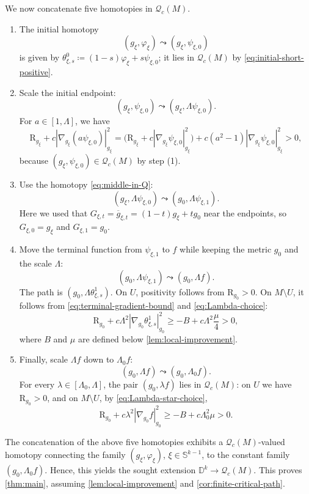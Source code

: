 \documentclass[11pt]{amsart}
\numberwithin{equation}{section}
\newcommand{\scal}{\mathrm{R}}
\newcommand{\Q}{\mathcal Q}
\let\geq\geqslant
\begin{document}
We now concatenate five homotopies in $\Q_c(M)$.
\begin{enumerate}[label=\textup{(\arabic*)}]
\item The initial homotopy
\[
 (g_\xi,\varphi_\xi)\leadsto(g_\xi,\psi_{\xi,0})
\]
is given by $\theta^{0}_{\xi,s}\coloneqq (1-s)\varphi_\xi+s\psi_{\xi,0}$; it lies in $\Q_c(M)$ by
\eqref{eq:initial-short-positive}.

\item Scale the initial endpoint:
\[
 (g_\xi,\psi_{\xi,0})\leadsto(g_\xi,\Lambda\psi_{\xi,0}).
\]
For $a\in[1,\Lambda]$, we have
\[
 \scal_{g_\xi}+c|\nabla_{g_\xi}(a\psi_{\xi,0})|_{g_\xi}^2
 =\bigl(\scal_{g_\xi}+c|\nabla_{g_\xi}\psi_{\xi,0}|_{g_\xi}^2\bigr)
  +c(a^2-1)|\nabla_{g_\xi}\psi_{\xi,0}|_{g_\xi}^2>0,
\]
because $(g_\xi,\psi_{\xi,0})\in\Q_c(M)$ by step (1).

\item Use the homotopy \eqref{eq:middle-in-Q}:
\[
 (g_\xi,\Lambda\psi_{\xi,0})\leadsto(g_0,\Lambda\psi_{\xi,1}).
\]
Here we used that $G_{\xi,t}=\overline g_{\xi,t} = (1-t)g_\xi+t g_0$ near the endpoints, so $G_{\xi,0}=g_\xi$ and $G_{\xi,1}=g_0$.

\item Move the terminal function from $\psi_{\xi,1}$ to $f$ while keeping the metric $g_0$ and the scale $\Lambda$:
\[
 (g_0,\Lambda\psi_{\xi,1})\leadsto(g_0,\Lambda f).
\]
The path is $(g_0,\Lambda\theta^{1}_{\xi,s})$. 
On $U$, positivity follows from $\scal_{g_0}>0$.
On $M\setminus U$, it follows from \eqref{eq:terminal-gradient-bound} and \eqref{eq:Lambda-choice}:
\[
 \scal_{g_0}+c\Lambda^2|\nabla_{g_0}\theta^{1}_{\xi,s}|_{g_0}^2
 \geq -B+c\Lambda^2\frac{\mu}{4}>0,
\]
where $B$ and $\mu$ are defined below \cref{lem:local-improvement}.

\item Finally, scale $\Lambda f$ down to $\Lambda_0f$:
\[
 (g_0,\Lambda f)\leadsto(g_0,\Lambda_0f).
\]
For every $\lambda\in[\Lambda_0,\Lambda]$, the pair $(g_0,\lambda f)$ lies in $\Q_c(M)$: on $U$ we
have $\scal_{g_0}>0$, and on $M\setminus U$, by \eqref{eq:Lambda-star-choice},
\[
 \scal_{g_0}+c\lambda^2|\nabla_{g_0}f|_{g_0}^2
 \geq -B+c\Lambda_0^2\mu>0.
\]
\end{enumerate}
The concatenation of the above five homotopies exhibits a $\mathcal{Q}_c(M)$-valued homotopy connecting the family $(g_\xi,\varphi_\xi)$, $\xi\in\mathbb S^{k-1}$, to the constant family $(g_0,\Lambda_0f)$. Hence, this yields the sought extension $\mathbb D^k\to \mathcal{Q}_c(M)$. 
This proves \cref{thm:main}, assuming \cref{lem:local-improvement} and \cref{cor:finite-critical-path}.
\end{document}
